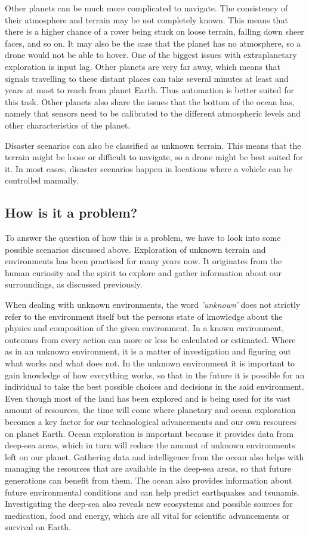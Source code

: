 Other planets can be much more complicated to navigate. The consistency of their atmosphere and terrain may be not completely known. This means that there is a higher chance of a rover being stuck on loose terrain, falling down sheer faces, and so on. It may also be the case that the planet has no atmosphere, so a drone would not be able to hover. One of the biggest issues with extraplanetary exploration is input lag. Other planets are very far away, which means that signals travelling to these distant places can take several minutes at least and years at most to reach from planet Earth. Thus automation is better suited for this task. Other planets also share the issues that the bottom of the ocean has, namely that sensors need to be calibrated to the different atmospheric levels and other characteristics of the planet.

Disaster scenarios can also be classified as unknown terrain. This means that the terrain might be loose or difficult to navigate, so a drone might be best suited for it. In most cases, disaster scenarios happen in locations where a vehicle can be controlled manually.

\subsection{How is it a problem?}

To answer the question of how this is a problem, we have to look into some possible scenarios discussed above. Exploration of unknown terrain and environments has been practised for many years now. It originates from the human curiosity and the spirit to explore and gather information about our surroundings, as discussed previously.

When dealing with unknown environments, the word \textit{'unknown'} does not strictly refer to the environment itself but the persons state of knowledge about the physics and composition of the given environment. In a known environment, outcomes from every action can more or less be calculated or estimated. Where as in an unknown environment, it is a matter of investigation and figuring out what works and what does not. In the unknown environment it is important to gain knowledge of how everything works, so that in the future it is possible for an individual to take the best possible choices and decisions in the said environment\cite{aiint}.
Even though most of the land has been explored and is being used for its vast amount of resources, the time will come where planetary and ocean exploration becomes a key factor for our technological advancements and our own resources on planet Earth. Ocean exploration is important because it provides data from deep-sea areas, which in turn will reduce the amount of unknown environments left on our planet.
Gathering data and intelligence from the ocean also helps with managing the resources that are available in the deep-sea areas, so that future generations can benefit from them. The ocean also provides information about future environmental conditions and can help predict earthquakes and tsunamis. Investigating the deep-sea also reveals new ecosystems and possible sources for medication, food and energy, which are all vital for scientific advancements or survival on Earth\cite{oceanexplo}.

